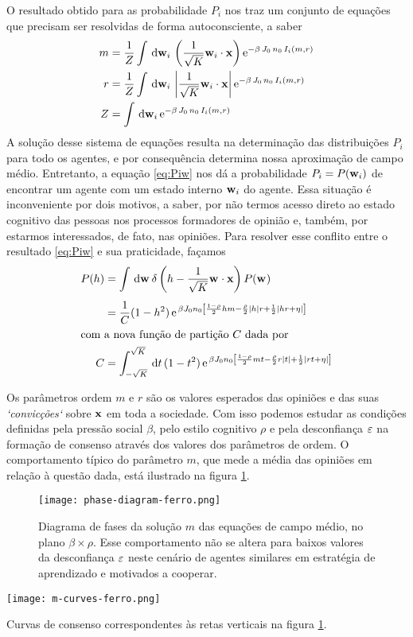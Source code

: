 O resultado obtido para as probabilidade $P_i$ nos traz um conjunto de equações que precisam ser resolvidas de forma autoconsciente, a saber
\begin{align}
  m & = \frac{1}{Z} \int \msr{\agt{i}} \inpr{\opn{i}{\qst}}\EulerE^{-\beta\,J_0\,n_0\,I_i(m,r)} \label{eq:sc-m}\\
  r & = \frac{1}{Z} \int \msr{\agt{i}} \left|\opn{i}{\qst}\right|\EulerE^{-\beta\,J_0\,n_0\,I_i(m,r)} \label{eq:sc-r}\\
  Z & = \int \msr{\agt{i}}\EulerE^{-\beta\,J_0\,n_0\,I_i(m,r)} \label{eq:sc-Z}
\end{align}
A solução desse sistema de equações resulta na determinação das distribuições $P_i$ para todo os agentes, e por consequência determina nossa aproximação de campo médio.
Entretanto, a equação \eqref{eq:Piw} nos dá a probabilidade $P_i = P(\mathbf{w}_{i})$ de encontrar um agente com um estado interno $\mathbf{w}_{i}$ do agente.
Essa situação é inconveniente por dois motivos, a saber, por não termos acesso direto ao estado cognitivo das pessoas nos processos formadores de opinião e, também, por estarmos interessados, de fato, nas opiniões.
Para resolver esse conflito entre o resultado \eqref{eq:Piw} e sua praticidade, façamos
\begin{align}
  P(h) & = \int \msr{\agt{ }} \delta\inpr{h - \opn{ }{\qst}} P(\agt{ }) \notag \\[4pt]
       & = \frac{1}{C}(1 - h^2)\,\EulerE^{\,\beta J_0 n_0 \inbk {
         \frac{1-\rho}{2}hm - \frac{\rho}{2}|h|r + \half|hr + \cutoff|}} \label{eq:Ph}\\
\intertext{com a nova função de partição $C$ dada por}
  C & = \int _{-\sqrt{K}}^{\sqrt{K}} \msr{t} (1 - t^2)\,\EulerE^{\,\beta J_0 n_0\inbk{
       \frac{1-\rho}{2} mt - \frac{\rho}{2}r|t| + \half|rt + \cutoff|}} \label{eq:Zh}
\end{align}

Os parâmetros ordem $m$ e $r$ são os valores esperados das opiniões e das suas \emph{`convicções`} sobre $\mathbf{x}$ em toda a sociedade.
Com isso podemos estudar as condições definidas pela pressão social $\beta$, pelo estilo cognitivo $\rho$ e pela desconfiança $\varepsilon$ na formação de consenso através dos valores dos parâmetros de ordem. O comportamento típico do parâmetro $m$, que mede a média das opiniões em relação à questão dada, está ilustrado na figura \ref{fig:pd-ferro}.

\begin{figure}[h!]\label{fig:pd-ferro}
  \centering
  \texttt{[image: phase-diagram-ferro.png]}
  \caption{Diagrama de fases da solução $m$ das equações de campo médio, no plano $\beta \times \rho$.
Esse comportamento não se altera para baixos valores da desconfiança $\varepsilon$ neste cenário de agentes similares em estratégia de aprendizado e motivados a cooperar.}
\end{figure}
\begin{marginfigure}[-7cm]
\texttt{[image: m-curves-ferro.png]}
\caption{Curvas de consenso correspondentes às retas verticais na figura \ref{fig:pd-ferro}.}
\end{marginfigure}

